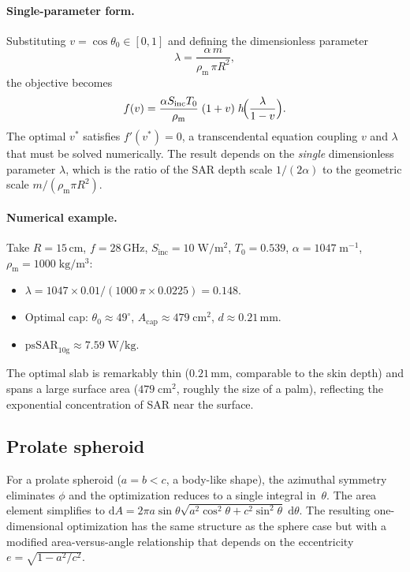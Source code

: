 \documentclass[11pt,a4paper]{article}
\theoremstyle{definition}
\theoremstyle{remark}
\newcommand{\Sinc}{S_{\mathrm{inc}}}
\newcommand{\Tzero}{T_0}
\newcommand{\psSAR}{\ensuremath{\mathrm{psSAR}_{10\mathrm{g}}}}
\newcommand{\rhom}{\rho_{\mathrm{m}}}
\begin{document}
\paragraph{Single-parameter form.}
Substituting $v = \cos\theta_0 \in [0,1]$ and defining the dimensionless
parameter
\begin{equation}\label{eq:lambda-def}
  \lambda = \frac{\alpha\,m}{\rhom\,\pi R^2},
\end{equation}
the objective becomes
\begin{equation}\label{eq:f-v}
  f(v) = \frac{\alpha\Sinc\Tzero}{\rhom}\;(1+v)\;
  h\!\Bigl(\frac{\lambda}{1-v}\Bigr).
\end{equation}
The optimal $v^*$ satisfies $f'(v^*) = 0$, a transcendental equation coupling
$v$ and $\lambda$ that must be solved numerically. The result depends on the
\emph{single} dimensionless parameter $\lambda$, which is the ratio of the SAR
depth scale $1/(2\alpha)$ to the geometric scale $m/(\rhom\pi R^2)$.

\paragraph{Numerical example.}
Take $R = 15$\,cm, $f = 28$\,GHz, $\Sinc = 10\;\mathrm{W/m^2}$,
$\Tzero = 0.539$, $\alpha = 1047\;\mathrm{m^{-1}}$, $\rhom = 1000\;\mathrm{kg/m^3}$:
\begin{itemize}[nosep]
\item $\lambda = 1047 \times 0.01 / (1000\,\pi \times 0.0225) = 0.148$.
\item Optimal cap: $\theta_0 \approx 49^\circ$,
      $A_{\mathrm{cap}} \approx 479\;\mathrm{cm}^2$,
      $d \approx 0.21$\,mm.
\item $\psSAR \approx 7.59\;\mathrm{W/kg}$.
\end{itemize}
The optimal slab is remarkably thin ($0.21$\,mm, comparable to the skin depth)
and spans a large surface area ($479\;\mathrm{cm}^2$, roughly the size of a
palm), reflecting the exponential concentration of SAR near the surface.

\subsection{Prolate spheroid}

For a prolate spheroid ($a = b < c$, a body-like shape), the azimuthal
symmetry eliminates $\phi$ and the optimization reduces to a single integral
in~$\theta$. The area element simplifies to
$\mathrm{d}A = 2\pi a\sin\theta\sqrt{a^2\cos^2\!\theta + c^2\sin^2\!\theta}\;\mathrm{d}\theta$.
The resulting one-dimensional optimization has the same structure as the sphere
case but with a modified area-versus-angle relationship that depends on the
eccentricity $e = \sqrt{1 - a^2/c^2}$.
\end{document}

